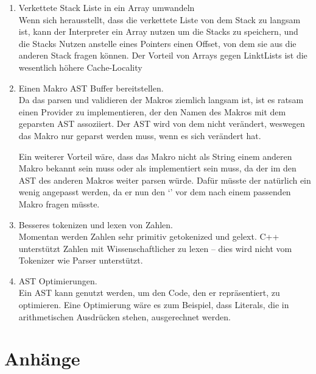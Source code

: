 {\begin{enumerate}[ref=\autoref{ssec:Ausblick}: Punkt \arabic*]
        Dies hätte zur Folge, dass der Nutzer mehr Fehler auf einmal beseitigen kann.
      \item Verkettete Stack Liste in ein Array umwandeln\label{enum:linkedlist}\\
        Wenn sich herausstellt, dass die verkettete Liste von dem Stack zu langsam ist, kann der Interpreter ein Array nutzen um die Stacks zu speichern, und die Stacks Nutzen anstelle eines Pointers einen Offset, von dem sie aus die anderen Stack fragen können. Der Vorteil von Arrays gegen LinktLists ist die wesentlich höhere Cache-Locality
      \item Einen Makro AST Buffer bereitstellen.\label{enum:astbuffer}\\
        Da das parsen und validieren der Makros ziemlich langsam ist, ist es ratsam einen Provider zu implementieren, der den Namen des Makros mit dem geparsten AST assoziiert. Der AST wird von dem  nicht verändert, weswegen das Makro nur geparst werden muss, wenn es sich verändert hat.

        Ein weiterer Vorteil wäre, dass das Makro nicht als String einem anderen Makro bekannt sein muss oder als  implementiert sein muss, da der  im den AST des anderen Makros weiter parsen würde. Dafür müsste der  natürlich ein wenig angepasst werden, da er nun den `' vor dem  nach einem passenden Makro fragen müsste.
      \item Besseres tokenizen und lexen von Zahlen.\label{enum:lexnumber}\\
        Momentan werden Zahlen sehr primitiv getokenized und gelext. C++ unterstützt Zahlen mit Wissenschaftlicher zu lexen -- dies wird nicht vom Tokenizer wie Parser unterstützt.
      \item AST Optimierungen.\\
        Ein AST kann genutzt werden, um den Code, den er repräsentiert, zu optimieren. Eine Optimierung wäre es zum Beispiel, dass Literals, die in arithmetischen Ausdrücken stehen, ausgerechnet werden.
    \end{enumerate}



\begingroup
\sloppy
\printbibliography
\endgroup
\listoffigures
\listofmyCodeEnvTypes
{} %


\section*{Anhänge}
\label{sec:Anhänge}


